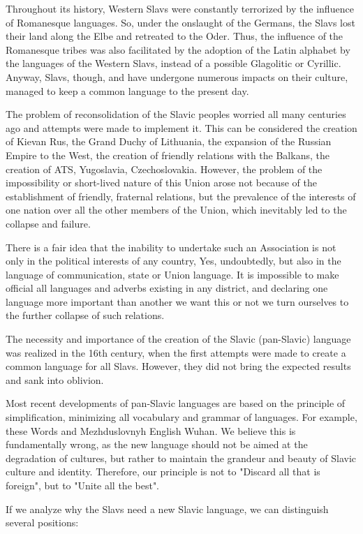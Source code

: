 Throughout its history, Western Slavs were constantly terrorized by the influence of Romanesque languages. So, under the onslaught of the Germans, the Slavs lost their land along the Elbe and retreated to the Oder. Thus, the influence of the Romanesque tribes was also facilitated by the adoption of the Latin alphabet by the languages of the Western Slavs, instead of a possible Glagolitic or Cyrillic. Anyway, Slavs, though, and have undergone numerous impacts on their culture, managed to keep a common language to the present day.

The problem of reconsolidation of the Slavic peoples worried all many centuries ago and attempts were made to implement it. This can be considered the creation of Kievan Rus, the Grand Duchy of Lithuania, the expansion of the Russian Empire to the West, the creation of friendly relations with the Balkans, the creation of ATS, Yugoslavia, Czechoslovakia. However, the problem of the impossibility or short-lived nature of this Union arose not because of the establishment of friendly, fraternal relations, but the prevalence of the interests of one nation over all the other members of the Union, which inevitably led to the collapse and failure.

There is a fair idea that the inability to undertake such an Association is not only in the political interests of any country, Yes, undoubtedly, but also in the language of communication, state or Union language. It is impossible to make official all languages and adverbs existing in any district, and declaring one language more important than another we want this or not we turn ourselves to the further collapse of such relations.

The necessity and importance of the creation of the Slavic (pan-Slavic) language was realized in the 16th century, when the first attempts were made to create a common language for all Slavs. However, they did not bring the expected results and sank into oblivion.

Most recent developments of pan-Slavic languages are based on the principle of simplification, minimizing all vocabulary and grammar of languages. For example, these Words and Mezhduslovnyh English Wuhan. We believe this is fundamentally wrong, as the new language should not be aimed at the degradation of cultures, but rather to maintain the grandeur and beauty of Slavic culture and identity. Therefore, our principle is not to "Discard all that is foreign", but to "Unite all the best".

If we analyze why the Slavs need a new Slavic language, we can distinguish several positions:

